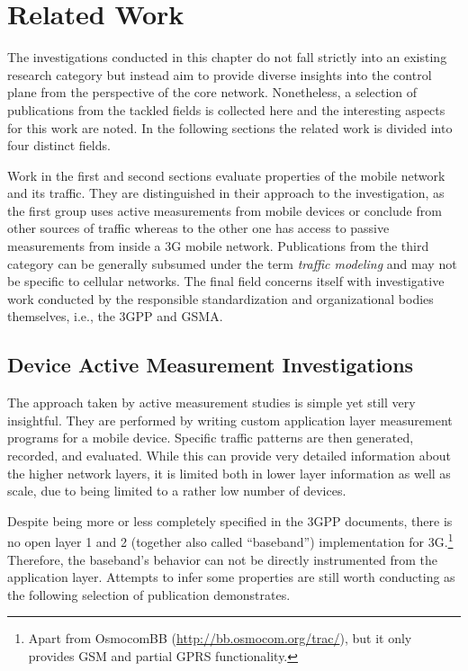 \section{Related Work}
\label{c4:sec:relwork}

The investigations conducted in this chapter do not fall strictly into an existing research category but instead aim to provide diverse insights into the control plane from the perspective of the core network. Nonetheless, a selection of publications from the tackled fields is collected here and the interesting aspects for this work are noted. In the following sections the related work is divided into four distinct fields.

Work in the first and second sections evaluate properties of the mobile network and its traffic. They are distinguished in their approach to the investigation, as the first group uses active measurements from mobile devices or conclude from other sources of traffic whereas to the other one has access to passive measurements from inside a \gls{3G} mobile network. Publications from the third category can be generally subsumed under the term \textit{traffic modeling} and may not be specific to cellular networks. The final field concerns itself with investigative work conducted by the responsible standardization and organizational bodies themselves, i.e., the \gls{3GPP} and \gls{GSMA}.


\subsection{Device Active Measurement Investigations}

The approach taken by active measurement studies is simple yet still very insightful. They are performed by writing custom application layer measurement programs for a mobile device. Specific traffic patterns are then generated, recorded, and evaluated. While this can provide very detailed information about the higher network layers, it is limited both in lower layer information as well as scale, due to being limited to a rather low number of devices.

Despite being more or less completely specified in the \gls{3GPP} documents, there is no open layer 1 and 2 (together also called ``baseband'') implementation for \gls{3G}.\footnote{Apart from OsmocomBB (\url{http://bb.osmocom.org/trac/}), but it only provides \gls{GSM} and partial \gls{GPRS} functionality.} Therefore, the baseband's behavior can not be directly instrumented from the application layer. Attempts to infer some properties are still worth conducting as the following selection of publication demonstrates.

